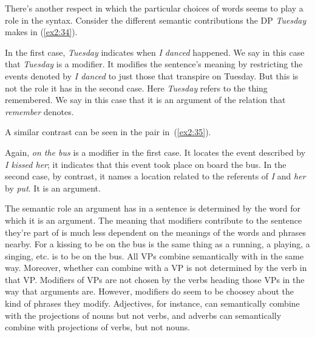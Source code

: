 There's another respect in which the particular choices of words seems to play a role in the syntax. Consider the different semantic contributions the DP \emph{Tuesday} makes in (\ref{ex2:34}).
\begin{exe}
	\ex \label{ex2:34} 
	\begin{xlist}
	\end{xlist}
\end{exe}
In the first case, \emph{Tuesday} indicates when \emph{I danced} happened. We say in this case that \emph{Tuesday} is a modifier. It modifies the sentence's meaning by restricting the events denoted by \emph{I danced} to just those that transpire on Tuesday. But this is not the role it has in the second case. Here \emph{Tuesday} refers to the thing remembered. We say in this case that it is an argument of the relation that \emph{remember} denotes.

A similar contrast can be seen in the pair in~(\ref{ex2:35}).
\begin{exe}
	\ex \label{ex2:35} 
	\begin{xlist}
	\ex[]{I kissed her on the bus.}
	\ex[]{I put her on the bus.}
	\end{xlist}
\end{exe}
Again, \emph{on the bus} is a modifier in the first case. It locates the event described by \emph{I kissed her}; it indicates that this event took place on board the bus. In the second case, by contrast, it names a location related to the referents of \emph{I} and \emph{her} by \emph{put}. It is an argument.

The semantic role an argument has in a sentence is determined by the word for which it is an argument. The meaning that modifiers contribute to the sentence they're part of is much less dependent on the meanings of the words and phrases nearby. For a kissing to be on the bus is the same thing as a running, a playing, a singing, etc. is to be on the bus. All VPs combine semantically with in the same way. Moreover, whether can combine with a VP is not determined by the verb in that VP. Modifiers of VPs are not chosen by the verbs heading those VPs in the way that arguments are. However, modifiers do seem to be choosey about the kind of phrases they modify. Adjectives, for instance, can semantically combine with the projections of nouns but not verbs, and adverbs can semantically combine with projections of verbs, but not nouns. 

